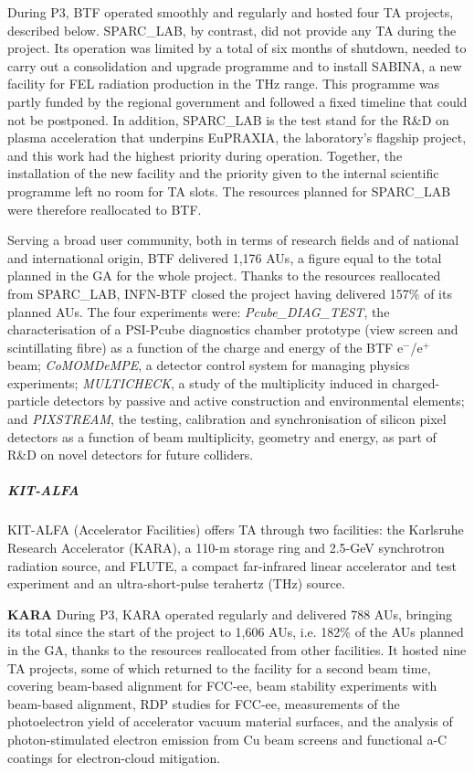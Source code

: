 During P3, BTF operated smoothly and regularly and hosted four TA projects, described below. SPARC\_LAB, by contrast, did not provide any TA during the project. Its operation was limited by a total of six months of shutdown, needed to carry out a consolidation and upgrade programme and to install SABINA, a new facility for FEL radiation production in the THz range. This programme was partly funded by the regional government and followed a fixed timeline that could not be postponed. In addition, SPARC\_LAB is the test stand for the R\&D on plasma acceleration that underpins EuPRAXIA, the laboratory's flagship project, and this work had the highest priority during operation. Together, the installation of the new facility and the priority given to the internal scientific programme left no room for TA slots. The resources planned for SPARC\_LAB were therefore reallocated to BTF.

Serving a broad user community, both in terms of research fields and of national and international origin, BTF delivered 1,176 AUs, a figure equal to the total planned in the GA for the whole project. Thanks to the resources reallocated from SPARC\_LAB, INFN-BTF closed the project having delivered 157\% of its planned AUs. The four experiments were: \textit{Pcube\_DIAG\_TEST}, the characterisation of a PSI-Pcube diagnostics chamber prototype (view screen and scintillating fibre) as a function of the charge and energy of the BTF e$^-$/e$^+$ beam; \textit{CoMOMDeMPE}, a detector control system for managing physics experiments; \textit{MULTICHECK}, a study of the multiplicity induced in charged-particle detectors by passive and active construction and environmental elements; and \textit{PIXSTREAM}, the testing, calibration and synchronisation of silicon pixel detectors as a function of beam multiplicity, geometry and energy, as part of R\&D on novel detectors for future colliders. 



\subparagraph{KIT-ALFA} \mbox{}

KIT-ALFA (Accelerator Facilities) offers TA through two facilities: the Karlsruhe Research Accelerator (KARA), a 110-m storage ring and 2.5-GeV synchrotron radiation source, and FLUTE, a compact far-infrared linear accelerator and test experiment and an ultra-short-pulse terahertz (THz) source.

\textbf{KARA} During P3, KARA operated regularly and delivered 788 AUs, bringing its total since the start of the project to 1,606 AUs, i.e. 182\% of the AUs planned in the GA, thanks to the resources reallocated from other facilities. It hosted nine TA projects, some of which returned to the facility for a second beam time, covering beam-based alignment for FCC-ee, beam stability experiments with beam-based alignment, RDP studies for FCC-ee, measurements of the photoelectron yield of accelerator vacuum material surfaces, and the analysis of photon-stimulated electron emission from Cu beam screens and functional a-C coatings for electron-cloud mitigation.

